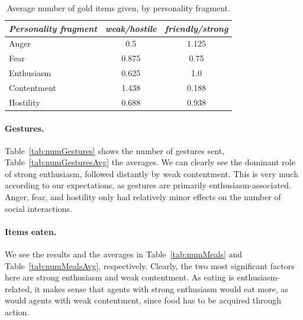 \begin{table}
	\centering
	\begin{tabular}{ l | c | c }
		\emph{Personality fragment} & \emph{weak/hostile} & \emph{friendly/strong} \\
		\hline
		Anger & 0.5 & 1.125\\
		Fear & 0.875 & 0.75\\
		Enthusiasm & 0.625 & 1.0\\
		Contentment & 1.438 & 0.188\\
		Hostility & 0.688 & 0.938\\
		\hline
	\end{tabular}
	\caption{Average number of gold items given, by personality fragment.}
	\label{tab:numGoldGivenAvg}
\end{table}

\paragraph{Gestures.} Table~\ref{tab:numGestures} shows the number of gestures sent, Table~\ref{tab:numGesturesAvg} the averages. We can clearly see the dominant role of strong enthusiasm, followed distantly by weak contentment. This is very much according to our expectations, as gestures are primarily enthusiasm-associated. Anger, fear, and hostility only had relatively minor effects on the number of social interactions.
	
\paragraph{Items eaten.} We see the results and the averages in Table~\ref{tab:numMeals} and Table~\ref{tab:numMealsAvg}, respectively. Clearly, the two most significant factors here are strong enthusiasm and weak contentment. As eating is enthusiasm-related, it makes sense that agents with strong enthusiasm would eat more, as would agents with weak contentment, since food has to be acquired through action.
	

